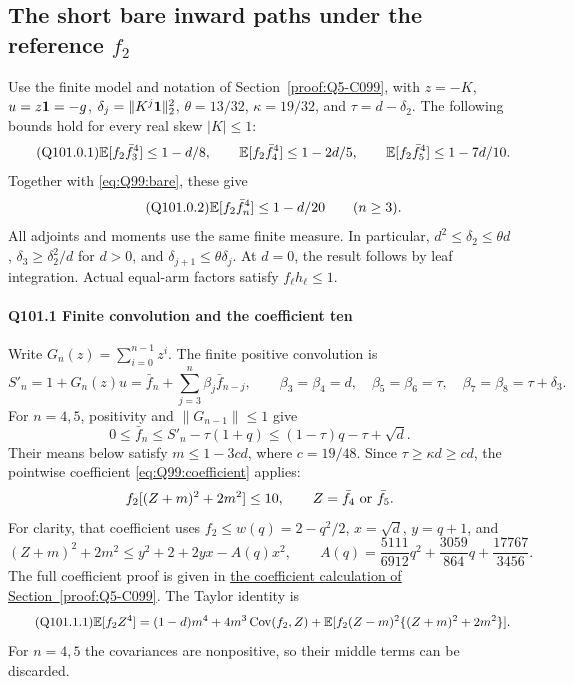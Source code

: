 \subsection{The short bare inward paths under the reference $f_2$}\label{proof:Q5-C101}
Use the finite model and notation of Section~\ref{proof:Q5-C099}, with
$z=\allowbreak -K$, $u=\allowbreak z\mathbf1=\allowbreak -g$, $\delta_j=\allowbreak \|K^j\mathbf1\|_2^2$,
$\theta=\allowbreak 13/32$, $\kappa=\allowbreak 19/32$, and $\tau=\allowbreak d-\delta_2$.
The following bounds hold for every real skew $|K|\le\allowbreak 1$:
\begin{equation}\tag{Q101.0.1}\label{eq:Q101:short}
 \mathbb E[f_2\bar f_3^4]\le1-d/8,\qquad
 \mathbb E[f_2\bar f_4^4]\le1-2d/5,\qquad
 \mathbb E[f_2\bar f_5^4]\le1-7d/10.
\end{equation}
Together with \eqref{eq:Q99:bare}, these give
\begin{equation}\tag{Q101.0.2}\label{eq:Q101:bare-all}
 \mathbb E[f_2\bar f_n^4]\le1-d/20\qquad(n\ge3).
\end{equation}
All adjoints and moments use the same finite measure. In particular,
$d^2\le\allowbreak \delta_2\le\allowbreak \theta d$, $\delta_3\ge\allowbreak \delta_2^2/d$ for $d>\allowbreak 0$,
and $\delta_{j+1}\le\allowbreak \theta\delta_j$.
At $d=\allowbreak 0$, the result follows by leaf integration.
Actual equal-arm factors satisfy $f_\ell h_\ell\le\allowbreak 1$.

\paragraph{Q101.1 Finite convolution and the coefficient ten}\label{part:Q101.1}
Write $G_n(z)=\allowbreak \sum_{i=\allowbreak 0}^{n-1}z^i$. The finite positive convolution is
\[
 S'_n=1+G_n(z)u
 =\bar f_n+\sum_{j=3}^n\beta_j\bar f_{n-j},\qquad
 \beta_3=\beta_4=d,\quad \beta_5=\beta_6=\tau,\quad
 \beta_7=\beta_8=\tau+\delta_3.
\]
For $n=\allowbreak 4,\allowbreak 5$, positivity and $\|G_{n-1}\|\le\allowbreak 1$ give
\[
 0\le\bar f_n\le S'_n-\tau(1+q)
 \le(1-\tau)q-\tau+\sqrt d.
\]
Their means below satisfy $m\le\allowbreak 1-3cd$, where $c=\allowbreak 19/48$.
Since $\tau\ge\allowbreak \kappa d\ge\allowbreak  cd$, the pointwise coefficient
\eqref{eq:Q99:coefficient} applies:
\[
 f_2[(Z+m)^2+2m^2]\le10,\qquad Z=\bar f_4\ \hbox{or}\ \bar f_5.
\]
For clarity, that coefficient uses $f_2\le\allowbreak  w(q)=\allowbreak 2-q^2/2$,
$x=\allowbreak \sqrt d$, $y=\allowbreak q+1$, and
\[
 (Z+m)^2+2m^2\le y^2+2+2yx-A(q)x^2,\qquad
 A(q)=\frac{5111}{6912}q^2+\frac{3059}{864}q+\frac{17767}{3456}.
\]
The full coefficient proof is given in
\hyperref[part:Q99.3]{the coefficient calculation of Section~\ref{proof:Q5-C099}}.
The Taylor identity is
\begin{equation}\tag{Q101.1.1}\label{eq:Q101:taylor}
 \mathbb E[f_2Z^4]=(1-d)m^4+4m^3\operatorname{Cov}(f_2,Z)
 +\mathbb E[f_2(Z-m)^2\{(Z+m)^2+2m^2\}].
\end{equation}
For $n=\allowbreak 4,\allowbreak 5$ the covariances are nonpositive, so their middle terms
can be discarded.

